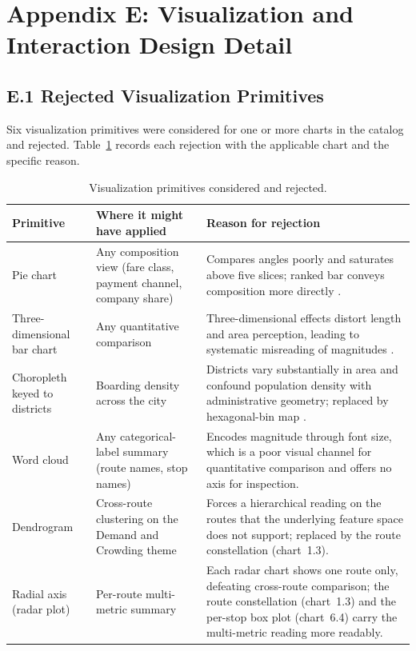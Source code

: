 \chapter*{Appendix E: Visualization and Interaction Design Detail}
\label{appendix:design_alternatives}

\section*{E.1 Rejected Visualization Primitives}
\label{sec:solution:viz:alt}

Six visualization primitives were considered for one or more charts in
the catalog and rejected. Table~\ref{tab:viz:rejected} records each
rejection with the applicable chart and the specific reason.

\begin{table}[!htbp]
  \centering
  \caption{Visualization primitives considered and rejected.}
  \label{tab:viz:rejected}
  \footnotesize
  \renewcommand{\arraystretch}{1.25}
  \begin{tabularx}{\linewidth}{p{3.0cm} X X}
    \hline
    \textbf{Primitive} & \textbf{Where it might have applied} & \textbf{Reason for rejection} \\
    \hline
    Pie chart & Any composition view (fare class, payment channel, company share) & Compares angles poorly and saturates above five slices; ranked bar conveys composition more directly \cite{knaflic2015}. \\
    Three-dimensional bar chart & Any quantitative comparison & Three-dimensional effects distort length and area perception, leading to systematic misreading of magnitudes \cite{knaflic2015}. \\
    Choropleth keyed to districts & Boarding density across the city & Districts vary substantially in area and confound population density with administrative geometry; replaced by hexagonal-bin map \cite{h3}. \\
    Word cloud & Any categorical-label summary (route names, stop names) & Encodes magnitude through font size, which is a poor visual channel for quantitative comparison and offers no axis for inspection. \\
    Dendrogram & Cross-route clustering on the Demand and Crowding theme & Forces a hierarchical reading on the routes that the underlying feature space does not support; replaced by the route constellation (chart~1.3). \\
    Radial axis (radar plot) & Per-route multi-metric summary & Each radar chart shows one route only, defeating cross-route comparison; the route constellation (chart~1.3) and the per-stop box plot (chart~6.4) carry the multi-metric reading more readably. \\
    \hline
  \end{tabularx}
\end{table}

